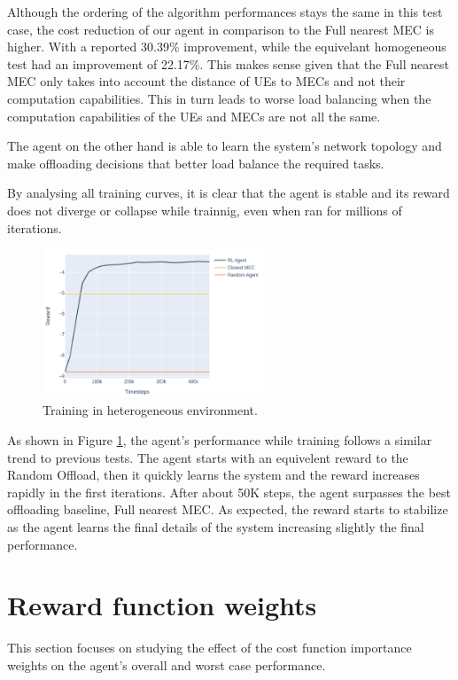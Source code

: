 Although the ordering of the algorithm performances stays the same in this test case, the cost reduction of our agent in comparison to the Full nearest MEC is higher. With a reported 30.39\% improvement, while the equivelant homogeneous test had an improvement of 22.17\%. This makes sense given that the Full nearest MEC only takes into account the distance of \acrshort{UE}s to \acrshort{MEC}s and not their computation capabilities. This in turn leads to worse load balancing when the computation capabilities of the \acrshort{UE}s and \acrshort{MEC}s are not all the same.

The agent on the other hand is able to learn the system's network topology and make offloading decisions that better load balance the required tasks. 

By analysing all training curves, it is clear that the agent is stable and its reward does not diverge or collapse while trainnig, even when ran for millions of iterations.

\begin{figure}[H]
  \centering
  \includegraphics[width=250px]{images/5_10_training_hetero.png}
  \caption{Training in heterogeneous environment.}  \label{hetero_training}
\end{figure}

As shown in Figure \ref{hetero_training}, the agent's performance while training follows a similar trend to previous tests. The agent starts with an equivelent reward to the Random Offload, then it quickly learns the system and the reward increases rapidly in the first iterations. After about 50K steps, the agent surpasses the best offloading baseline, Full nearest MEC. As expected, the reward starts to stabilize as the agent learns the final details of the system increasing slightly the final performance.

\section{Reward function weights} \label{reward_section}

This section focuses on studying the effect of the cost function importance weights on the agent's overall and worst case performance.

